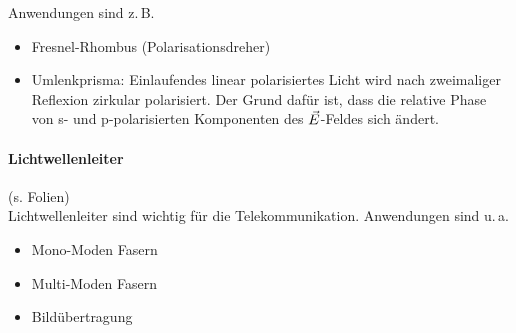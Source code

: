 Anwendungen sind z.\,B.
\begin{itemize}
\item Fresnel-Rhombus (Polarisationsdreher)
\item Umlenkprisma: Einlaufendes linear polarisiertes Licht wird
  nach zweimaliger Reflexion zirkular polarisiert.
  Der Grund dafür ist, dass die relative Phase von s- und
  p-polarisierten Komponenten des $\vec{E}$-Feldes sich ändert.
\end{itemize}

\paragraph{Lichtwellenleiter}
(s. Folien)\\
Lichtwellenleiter sind wichtig für die Telekommunikation. 
Anwendungen sind u.\,a.
\begin{itemize}
\item Mono-Moden Fasern
\item Multi-Moden Fasern
\item Bildübertragung
\end{itemize}


